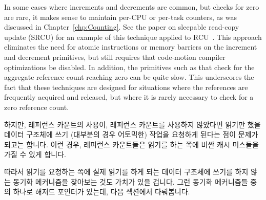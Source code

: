 In some cases where increments and decrements are common, but checks
for zero are rare, it makes sense to maintain per-CPU or per-task
counters, as was discussed in Chapter~\ref{chp:Counting}.
See the paper on sleepable read-copy update
(SRCU) for an example of this technique applied to
RCU~\cite{PaulEMcKenney2006c}.
This approach eliminates the need for atomic instructions or memory
barriers on the increment and decrement primitives, but still requires
that code-motion compiler optimizations be disabled.
In addition, the primitives such as 
that check for the aggregate reference
count reaching zero can be quite slow.
This underscores the fact that these techniques are designed
for situations where the references are frequently acquired and
released, but where it is rarely necessary to check for a zero
reference count.
\fi


하지만, 레퍼런스 카운트의 사용이, 레퍼런스 카운트를 사용하지 않았다면 읽기만
했을 데이터 구조체에 쓰기 (대부분의 경우 어토믹한) 작업을 요청하게 된다는 점이
문제가 되고는 합니다.
이런 경우, 레퍼런스 카운트들은 읽기를 하는 쪽에 비싼 캐시 미스들을 가질 수 있게
합니다.

따라서 읽기를 요청하는 쪽에 실제 읽기를 하게 되는 데이터 구조체에 쓰기를 하지
않는 동기화 메커니즘을 찾아보는 것도 가치가 있을 겁니다.
그런 동기화 메커니즘들 중의 하나로 해저드 포인터가 있는데, 다음 섹션에서
다뤄봅니다.

